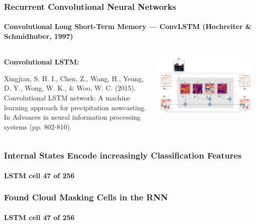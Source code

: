 \begin{frame}[t]
\frametitle{Recurrent Convolutional Neural Networks}
\framesubtitle{Convolutional Long Short-Term Memory --- ConvLSTM (Hochreiter \& Schmidhuber, 1997)}
\begin{columns}
	\begin{column}{0.3\textwidth}
		
		
		\textbf{Convolutional LSTM:}
		
		\vspace{2em}
		{\scriptsize
			Xingjian, S. H. I., Chen, Z., Wang, H., Yeung, D. Y., Wong, W. K., \& Woo, W. C. (2015). Convolutional LSTM network: A machine learning approach for precipitation nowcasting. In Advances in neural information processing systems (pp. 802-810). \par
		}
		
	\end{column}
	\vspace{-2em}	
	\begin{column}{0.7\textwidth}
		
		\includegraphics[width=\textwidth]{images/convlstm}	
	\end{column}
\end{columns}



\end{frame}



\begin{frame}
\frametitle{Internal States Encode increasingly Classification Features}
\framesubtitle{LSTM cell \textbf{47} of 256}
\end{frame}
%

\begin{frame}
\frametitle{Found Cloud Masking Cells in the RNN}
\framesubtitle{LSTM cell \textbf{47} of 256}
\end{frame}

